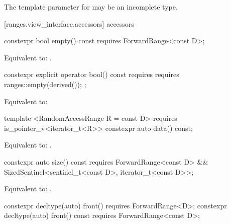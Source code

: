 \pnum
The template parameter for  may be an incomplete type.

[ranges.view_interface.accessors]{ accessors}

%
\begin{itemdecl}
constexpr bool empty() const requires ForwardRange<const D>;
\end{itemdecl}

\begin{itemdescr}
\pnum
\effects Equivalent to: .
\end{itemdescr}

%
\begin{itemdecl}
constexpr explicit operator bool() const
  requires requires { ranges::empty(derived()); };
\end{itemdecl}

\begin{itemdescr}
\pnum
\effects Equivalent to: 
\end{itemdescr}

%
\begin{itemdecl}
template <RandomAccessRange R = const D>
    requires is_pointer_v<iterator_t<R>>
  constexpr auto data() const;
\end{itemdecl}

\begin{itemdescr}
\pnum
\effects Equivalent to: .
\end{itemdescr}

%
\begin{itemdecl}
constexpr auto size() const requires ForwardRange<const D> &&
SizedSentinel<sentinel_t<const D>, iterator_t<const D>>;
\end{itemdecl}

\begin{itemdescr}
\pnum
\effects Equivalent to: .
\end{itemdescr}

%
\begin{itemdecl}
constexpr decltype(auto) front() requires ForwardRange<D>;
constexpr decltype(auto) front() const requires ForwardRange<const D>;
\end{itemdecl}

